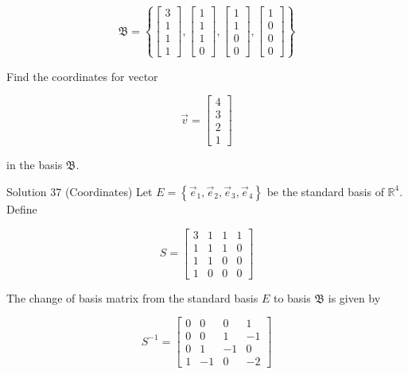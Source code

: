 \documentclass[10pt]{article}
\begin{document}
$$
\mathfrak{B}=\left\{\left[\begin{array}{l}
3 \\
1 \\
1 \\
1
\end{array}\right],\left[\begin{array}{l}
1 \\
1 \\
1 \\
0
\end{array}\right],\left[\begin{array}{l}
1 \\
1 \\
0 \\
0
\end{array}\right],\left[\begin{array}{l}
1 \\
0 \\
0 \\
0
\end{array}\right]\right\}
$$

Find the coordinates for vector

$$
\vec{v}=\left[\begin{array}{l}
4 \\
3 \\
2 \\
1
\end{array}\right]
$$

in the basis $\mathfrak{B}$.

Solution 37 (Coordinates) Let $E=\left\{\vec{e}_{1}, \vec{e}_{2}, \vec{e}_{3}, \vec{e}_{4}\right\}$ be the standard basis of $\mathbb{R}^{4}$. Define

$$
S=\left[\begin{array}{llll}
3 & 1 & 1 & 1 \\
1 & 1 & 1 & 0 \\
1 & 1 & 0 & 0 \\
1 & 0 & 0 & 0
\end{array}\right]
$$

The change of basis matrix from the standard basis $E$ to basis $\mathfrak{B}$ is given by

$$
S^{-1}=\left[\begin{array}{cccc}
0 & 0 & 0 & 1 \\
0 & 0 & 1 & -1 \\
0 & 1 & -1 & 0 \\
1 & -1 & 0 & -2
\end{array}\right]
$$
\end{document}
